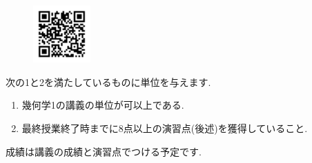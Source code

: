 \documentclass[dvipdfmx,a4paper,11pt]{article}
\theoremstyle{definition}
\begin{document}
\begin{figure}[htbp]
\begin{center}
 \includegraphics[height=22mm, width=22mm]{set.png}
\end{center}
\end{figure}

次の1と2を満たしているものに単位を与えます.
\begin{enumerate}
  \setlength{\parskip}{0cm} %
  \setlength{\itemsep}{0cm} %
\item 幾何学1の講義の単位が可以上である.
\item 最終授業終了時までに8点以上の演習点(後述)を獲得していること.
\end{enumerate}
成績は講義の成績と演習点でつける予定です.
\end{document}
